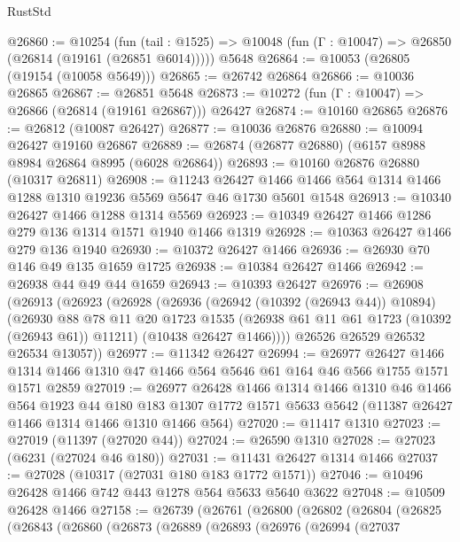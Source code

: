 \begin{lexlean}{RustStd}
\begin{coremodule}
{{@26860 := @10254
    (fun (tail : @1525) => @10048 (fun (Γ : @10047) => @26850 (@26814 (@19161 (@26851 @6014)))))
    @5648
@26864 := @10053 (@26805 (@19154 (@10058 @5649)))
@26865 := @26742 @26864
@26866 := @10036 @26865
@26867 := @26851 @5648
@26873 := @10272 (fun (Γ : @10047) => @26866 (@26814 (@19161 @26867))) @26427
@26874 := @10160 @26865
@26876 := @26812 (@10087 @26427)
@26877 := @10036 @26876
@26880 := @10094 @26427 @19160 @26867
@26889 := @26874 (@26877 @26880) (@6157 @8988 @8984 @26864 @8995 (@6028 @26864))
@26893 := @10160 @26876 @26880 (@10317 @26811)
@26908 := @11243
    @26427
    @1466
    @1466
    @564
    @1314
    @1466
    @1288
    @1310
    @19236
    @5569
    @5647
    @46
    @1730
    @5601
    @1548
@26913 := @10340 @26427 @1466 @1288 @1314 @5569
@26923 := @10349 @26427 @1466 @1286 @279 @136 @1314 @1571 @1940 @1466 @1319
@26928 := @10363 @26427 @1466 @279 @136 @1940
@26930 := @10372 @26427 @1466
@26936 := @26930 @70 @146 @49 @135 @1659 @1725
@26938 := @10384 @26427 @1466
@26942 := @26938 @44 @49 @44 @1659
@26943 := @10393 @26427
@26976 := @26908
    (@26913
      (@26923
        (@26928
          (@26936
            (@26942 (@10392 (@26943 @44)) @10894)
            (@26930
              @88
              @78
              @11
              @20
              @1723
              @1535
              (@26938 @61 @11 @61 @1723 (@10392 (@26943 @61)) @11211)
              (@10438 @26427 @1466))))
        @26526
        @26529
        @26532
        @26534
        @13057))
@26977 := @11342 @26427
@26994 := @26977
    @26427
    @1466
    @1314
    @1466
    @1310
    @47
    @1466
    @564
    @5646
    @61
    @164
    @46
    @566
    @1755
    @1571
    @1571
    @2859
@27019 := @26977
    @26428
    @1466
    @1314
    @1466
    @1310
    @46
    @1466
    @564
    @1923
    @44
    @180
    @183
    @1307
    @1772
    @1571
    @5633
    @5642
    (@11387 @26427 @1466 @1314 @1466 @1310 @1466 @564)
@27020 := @11417 @1310
@27023 := @27019 (@11397 (@27020 @44))
@27024 := @26590 @1310
@27028 := @27023 (@6231 (@27024 @46 @180))
@27031 := @11431 @26427 @1314 @1466
@27037 := @27028 (@10317 (@27031 @180 @183 @1772 @1571))
@27046 := @10496 @26428 @1466 @742 @443 @1278 @564 @5633 @5640 @3622
@27048 := @10509 @26428 @1466
@27158 := @26739
    (@26761
      (@26800
        (@26802
          (@26804
            (@26825
              (@26843
                (@26860
                  (@26873
                    (@26889
                      (@26893
                        (@26976
                          (@26994
                            (@27037
}}
\end{coremodule}
\end{lexlean}
